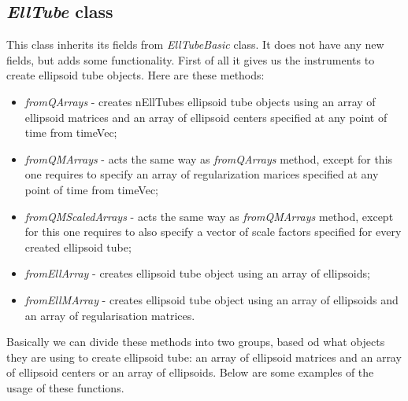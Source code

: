\documentclass[letterpaper,10pt,english]{sphinxmanual}
\begin{document}
\subsection{\emph{EllTube} class}
\label{chap_ellTube:elltube-class}
This class inherits its fields from \emph{EllTubeBasic} class. It does not have any new fields, but adds some functionality. First of all it gives us the instruments to create ellipsoid tube objects. Here are these methods:
\begin{itemize}
\item {} 
\emph{fromQArrays} - creates nEllTubes ellipsoid tube objects using an array of ellipsoid matrices     and an array of ellipsoid centers specified at any point of time from timeVec;

\item {} 
\emph{fromQMArrays} - acts the same way as \emph{fromQArrays} method, except for this one requires to    specify an array of regularization marices specified at any point of time from timeVec;

\item {} 
\emph{fromQMScaledArrays} - acts the same way as \emph{fromQMArrays} method, except for this one       requires to also specify a vector of scale factors specified for every created ellipsoid tube;

\item {} 
\emph{fromEllArray} - creates ellipsoid tube object using an array of ellipsoids;

\item {} 
\emph{fromEllMArray} - creates ellipsoid tube object using an array of ellipsoids and an array of    regularisation matrices.

\end{itemize}

Basically we can divide these methods into two groups, based od what objects they are using to create ellipsoid tube: an array of ellipsoid matrices and an array of ellipsoid centers or an array of ellipsoids. Below are some examples of the usage of these functions.
\end{document}
